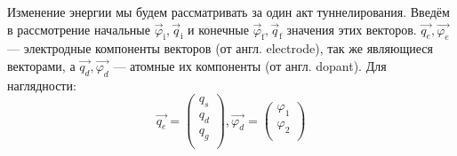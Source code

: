 \documentclass[12pt,a4paper]{report}
\begin{document}
Изменение энергии мы будем рассматривать за один акт туннелирования. Введём в рассмотрение начальные $\vec{\varphi}_{\mbox{i}}, \vec{q}_{\mbox{i}}$ и конечные $\vec{\varphi}_{\mbox{f}}, \vec{q}_{\mbox{f}}$ значения этих векторов. $\vec{q_e}, \vec{\varphi_e}$ — электродные компоненты векторов (от англ. electrode), так же являющиеся векторами, а $\vec{q_d}, \vec{\varphi_d}$ — атомные их компоненты (от англ. dopant). Для наглядности:
\begin{equation}
\vec{q_e} = \left(
\begin{array}{c}
q_s\\
q_d\\
q_g\\
\end{array}
\right),
\vec{\varphi_d} = \left(
\begin{array}{c}
\varphi_1\\
\varphi_2\\
\end{array}
\right)
\end{equation}
\end{document}
